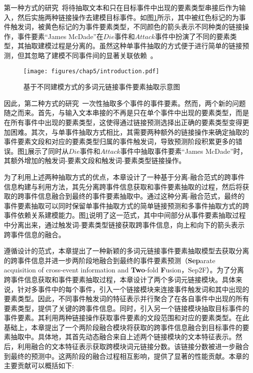 第一种方式的研究~\cite{wang2022query,liu2023rexuie}将待抽取文本和只在目标事件中出现的要素类型串接后作为输入，然后实施两种链接操作去建模目标事件。如图\ref{example}所示，其中被红色标记的为事件触发词，被黄色标记的为事件要素类型，不同颜色的箭头表示不同种类的链接操作，事件要素“James McDade”在$Die$事件和$Attack$事件中扮演了不同的要素类型，其抽取建模过程是分离的。虽然这种单事件抽取的方式便于进行简单的链接预测，但其忽略了建模不同事件间的显著关联依赖~\cite{zeng2022ea2e,he2023revisiting,li2023intra}。

\begin{figure}[htp]
\centering
\texttt{[image: figures/chap5/introduction.pdf]} 
\caption{基于不同建模方式的多词元链接事件要素抽取示意图}
\label{example}
\end{figure}

因此，第二种方式的研究~\cite{lou2023universal}一次性抽取多个事件的事件要素。然而，两个新的问题随之而来。首先，与输入文本串接的不再是只在单个事件中出现的要素类型，而是在所有事件中出现的要素类型，这使得通过链接预测选择出正确的要素类型变得更加困难。其次，与单事件抽取方式相比，其需要两种额外的链接操作来确定抽取的事件要素文段和对应的要素类型归属的事件触发词，导致预测阶段积累更多的错误。图\ref{example}展示了同时从$Die$事件和$Attack$事件中抽取事件要素“James McDade”时，其额外增加的触发词-要素文段和触发词-要素类型链接操作。

为了利用上述两种抽取方式的优点，本章设计了一种基于分离-融合范式的跨事件信息构建与利用方法，其先分离跨事件信息获取和事件要素抽取的过程，然后将获取的跨事件信息融合到最终的事件要素抽取中。通过这种分离-融合范式，最终的事件要素抽取可以同时保留单事件抽取方式的简单链接预测和多事件抽取方式的跨事件依赖关系建模能力。图\ref{example}说明了这一范式，其中中间部分从事件要素抽取过程中分离出来，通过触发词-要素类型链接获取跨事件信息，向上和向下的箭头表示跨事件信息的融合。

遵循设计的范式，本章提出了一种新颖的多词元链接事件要素抽取模型去获取分离的跨事件信息并进一步两阶段地融合到最终的事件要素预测（\textbf{Sep}arate acquisition of cross-event information and \textbf{Two}-fold \textbf{F}usion，Sep2F）。为了分离跨事件信息获取和事件要素抽取过程，本章设计了两个多词元链接模块。具体来说，针对多事件中的每个事件，引入一个链接模块来连接事件触发词和其中出现的要素类型。因此，不同事件触发词的特征表示并行聚合了在各自事件中出现的所有要素类型，提供了关键的跨事件信息。同时，引入另一个链接模块抽取目标事件的事件要素。其利用两种链接操作获取事件要素的文段范围和对应的要素类型。在此基础上，本章提出了一个两阶段融合模块将获取的跨事件信息融合到目标事件的要素抽取中。具体地，其首先动态融合来自上述两个链接模块的文本特征表示。然后，利用融合的文本特征表示获取跨模块词元链接分数。该链接分数被进一步融合到最终的预测中。这两阶段的融合过程相互影响，提供了显著的性能贡献。本章的主要贡献可以概括如下:

